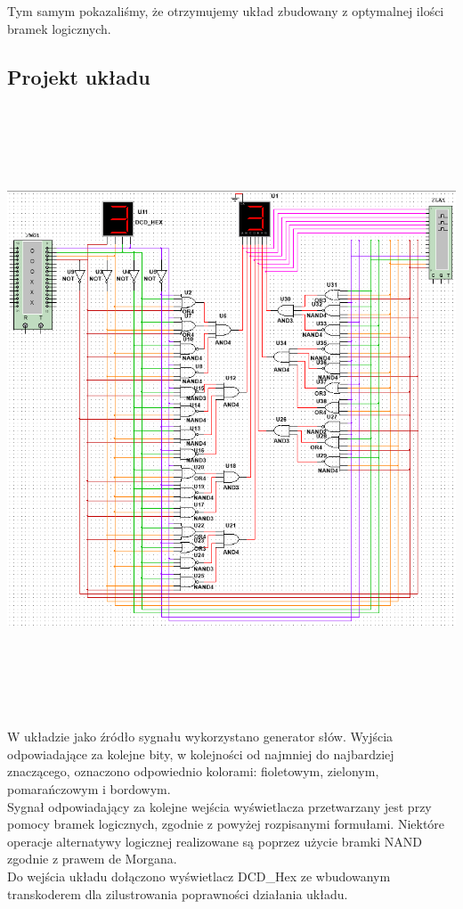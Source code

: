\documentclass{article}
\begin{document}
            Tym samym pokazaliśmy, że otrzymujemy układ zbudowany z optymalnej ilości bramek logicznych. 
        
        \subsection{Projekt układu}
            \begin{center}
                \includegraphics[height=18cm]{reports/img/Z1C_1.png}\\
            \end{center}
            W układzie jako źródło sygnału wykorzystano generator słów. Wyjścia odpowiadające za kolejne bity, w kolejności od najmniej do najbardziej znaczącego, oznaczono odpowiednio kolorami: fioletowym, zielonym, pomarańczowym i bordowym. \\
            Sygnał odpowiadający za kolejne wejścia wyświetlacza przetwarzany jest przy pomocy bramek logicznych, zgodnie z powyżej rozpisanymi formułami. Niektóre operacje alternatywy logicznej realizowane są poprzez użycie bramki NAND zgodnie z prawem de Morgana. \\
            Do wejścia układu dołączono wyświetlacz DCD\_Hex ze wbudowanym transkoderem dla zilustrowania poprawności działania układu.
        
\end{document}
